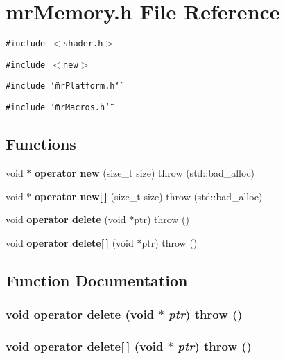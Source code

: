 \section{mr\-Memory.h File Reference}
\label{mrMemory_8h}
{\tt \#include $<$shader.h$>$}\par
{\tt \#include $<$new$>$}\par
{\tt \#include \char`\"{}mr\-Platform.h\char`\"{}}\par
{\tt \#include \char`\"{}mr\-Macros.h\char`\"{}}\par
\subsection*{Functions}
\begin{CompactItemize}
\item 
void $\ast$ {\bf operator new} (size\_\-t size)  throw (std::bad\_\-alloc)
\item 
void $\ast$ {\bf operator new[$\,$]} (size\_\-t size)  throw (std::bad\_\-alloc)
\item 
void {\bf operator delete} (void $\ast$ptr)  throw ()
\item 
void {\bf operator delete[$\,$]} (void $\ast$ptr)  throw ()
\end{CompactItemize}


\subsection{Function Documentation}
\subsubsection{\setlength{\rightskip}{0pt plus 5cm}void operator delete (void $\ast$ {\em ptr})  throw ()\hspace{0.3cm}{\tt  [inline]}}\label{mrMemory_8h_a2}


\subsubsection{\setlength{\rightskip}{0pt plus 5cm}void operator delete[$\,$] (void $\ast$ {\em ptr})  throw ()\hspace{0.3cm}{\tt  [inline]}}\label{mrMemory_8h_a3}



